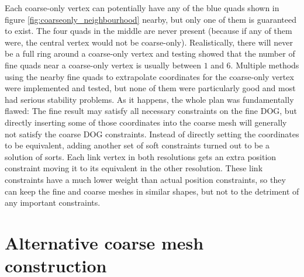 \documentclass[a4paper,twoside,12pt,nochapterprefix]{scrbook}
\begin{document}
Each coarse-only vertex can potentially have any of the blue quads shown in figure \ref{fig:coarseonly_neighbourhood} nearby, but only one of them is guaranteed to exist. The four quads in the middle are never present (because if any of them were, the central vertex would not be coarse-only). Realistically, there will never be a full ring around a coarse-only vertex and testing showed that the number of fine quads near a coarse-only vertex is usually between $1$ and $6$.\newline
Multiple methods using the nearby fine quads to extrapolate coordinates for the coarse-only vertex were implemented and tested, but none of them were particularly good and most had serious stability problems. As it happens, the whole plan was fundamentally flawed: The fine result may satisfy all necessary constraints on the fine DOG, but directly inserting some of those coordinates into the coarse mesh will generally not satisfy the coarse DOG constraints.\newline
Instead of directly setting the coordinates to be equivalent, adding another set of soft constraints turned out to be a solution of sorts. Each link vertex in both resolutions gets an extra position constraint moving it to its equivalent in the other resolution. These link constraints have a much lower weight than actual position constraints, so they can keep the fine and coarse meshes in similar shapes, but not to the detriment of any important constraints.\newline
\section{Alternative coarse mesh construction}\label{sec:coarse_construction_alt}
\end{document}
